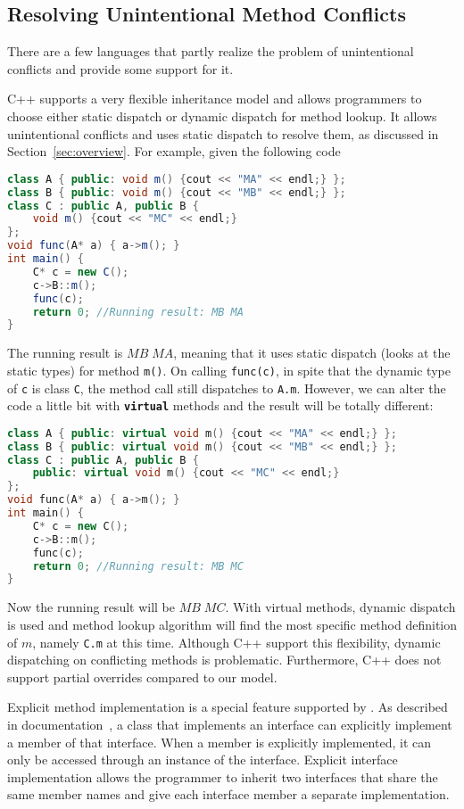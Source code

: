 \subsection{Resolving Unintentional Method Conflicts}
There are a few languages that partly realize the problem of
unintentional conflicts and provide some support for it.

C++ supports a very flexible inheritance model and allows programmers to choose either static dispatch or dynamic dispatch for method lookup.
It allows unintentional conflicts and uses static dispatch to resolve them, as discussed in Section~\ref{sec:overview}. For example, given the following code
\begin{lstlisting}[language=Java]
class A { public: void m() {cout << "MA" << endl;} };
class B { public: void m() {cout << "MB" << endl;} };
class C : public A, public B { 
	void m() {cout << "MC" << endl;}
};
void func(A* a) { a->m(); }
int main() {
	C* c = new C();
	c->B::m();
	func(c); 
	return 0; //Running result: MB MA
}
\end{lstlisting}
The running result is $MB \; MA$, meaning that it uses static dispatch (looks at the static types) for method \lstinline|m()|. 
On calling \texttt{func(c)}, in spite that the dynamic type of \texttt{c} is class \texttt{C}, the method call still dispatches to 
\lstinline|A.m|.
However, we can alter the code a little bit with \textbf{\texttt{virtual}} methods and the result will be totally different:
\begin{lstlisting}[language=c++]
class A { public: virtual void m() {cout << "MA" << endl;} };
class B { public: virtual void m() {cout << "MB" << endl;} };
class C : public A, public B { 
    public: virtual void m() {cout << "MC" << endl;}
};
void func(A* a) { a->m(); }
int main() {
	C* c = new C();
	c->B::m();
	func(c); 
	return 0; //Running result: MB MC
}
\end{lstlisting}
Now the running result will be $MB \; MC$. With virtual methods, dynamic dispatch is used and 
method lookup algorithm will find the most specific method definition of $m$, namely \lstinline|C.m| at this time.
Although C++ support this flexibility, dynamic dispatching on
conflicting methods is problematic.
Furthermore, C++ does not support partial overrides compared to our
model.

Explicit method implementation is a special feature supported by
\csharp{}. As described in \csharp{} documentation~\cite{csharpdoc}, a
class that implements an interface can explicitly implement a member
of that interface. When a member is explicitly implemented, it can
only be accessed through an instance of the interface. Explicit
interface implementation allows the programmer to inherit two
interfaces that share the same member names and give each interface
member a separate implementation.

